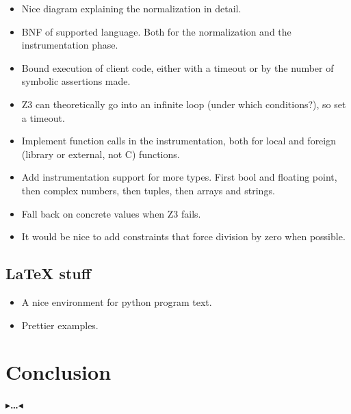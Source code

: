 \documentclass[11pt]{report}
\newcommand{\todo}[1]{{\color[rgb]{.5,0,0}\textbf{$\blacktriangleright$#1$\blacktriangleleft$}}}
\begin{document}
\begin{itemize}
  \item Nice diagram explaining the normalization in detail.
  \item BNF of supported language. Both for the normalization and the
    instrumentation phase.
  \item Bound execution of client code, either with a timeout or by
    the number of symbolic assertions made.
  \item Z3 can theoretically go into an infinite loop (under which
    conditions?), so set a timeout.
  \item Implement function calls in the instrumentation, both for
    local and foreign (library or external, not C) functions.
  \item Add instrumentation support for more types. First bool and
    floating point, then complex numbers, then tuples, then arrays and
    strings.
  \item Fall back on concrete values when Z3 fails.
  \item It would be nice to add constraints that force division by
    zero when possible.
\end{itemize}

\section{\LaTeX{} stuff}

\begin{itemize}
  \item A nice environment for python program text.
  \item Prettier examples.
\end{itemize}


\chapter{Conclusion}
\label{ch:conclusion}

\todo{\dots}
\end{document}
